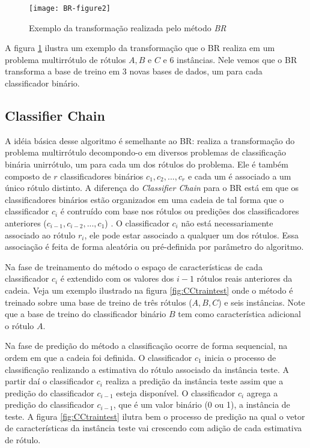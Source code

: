 \begin{figure}
 \texttt{[image: BR-figure2]}
 
 \caption{Exemplo da transformação realizada pelo método \textit{BR}}
\label{fig:br}

\end{figure}

A figura \ref{fig:br} ilustra um exemplo da transformação que o BR realiza em um problema multirrótulo
de rótulos $A,B$ e $C$ e 6 instâncias. Nele vemos que o BR transforma a base de treino em 3 novas bases
de dados, um para cada classificador binário.





\subsection{Classifier Chain}


A idéia básica desse algoritmo é semelhante ao BR: realiza a transformação do
problema multirrótulo decompondo-o em diversos problemas
de classificação binária unirrótulo, um para cada um dos rótulos do problema.
Ele é também composto de $r$ classificadores binários $c_1,c_2,...,c_r$ e cada um
é associado a um único rótulo distinto. A diferença do \textit{Classifier Chain} para o BR está
em que os classificadores binários estão organizados em uma cadeia de tal forma que
o classificador $c_i$ é contruído com base nos rótulos ou predições dos classificadores anteriores
($c_{i-1},c_{i-2},...,c_{1}$) \cite{cc2009}. O classificador $c_i$ não está necessariamente associado ao rótulo $r_i$,
ele pode estar associado a qualquer um dos rótulos.
Essa associação é feita de forma aleatória ou pré-definida por parâmetro do algoritmo.

Na fase de treinamento do método o espaço de características de cada classificador $c_i$ é 
extendido com os valores dos $i-1$ rótulos reais anteriores da cadeia. Veja um exemplo 
ilustrado na figura \ref{fig:CCtraintest} onde o método é treinado sobre uma base de treino de três rótulos ($A,B,C$)
e seis instâncias. Note que a base de treino do classificador binário $B$ tem como característica adicional o rótulo $A$.

Na fase de predição do método a classificação ocorre de forma sequencial, na ordem em que a cadeia foi definida.
O classificador $c_1$ inicia o processo de classificação realizando a estimativa do rótulo associado da instância teste.
A partir daí o classificador $c_i$ realiza a predição da instância teste assim que a predição do classificador $c_{i-1}$
esteja disponível. O classificador $c_i$ agrega a predição do classificador $c_{i-1}$, que é um valor binário (0 ou 1),
a instância de teste. A figura \ref{fig:CCtraintest} ilutra bem o processo de predição na qual o vetor de características da
instância teste vai crescendo com adição de cada estimativa de rótulo.


